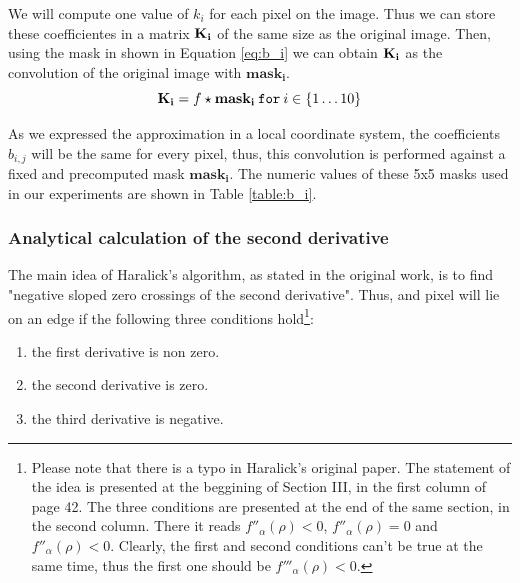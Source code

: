\documentclass{ipol}
\numberwithin{equation}{section}
\numberwithin{table}{section}
\begin{document}
{\vspace{1ex}
\myn{\label{second_derivative:haralick:mask_computation}} We will compute one value of $k_i$ for each pixel on the image. Thus we can store these coefficientes in a matrix $\bf{K_i}$ of the same size as the original image. Then, using the mask in shown in Equation \ref{eq:b_i} we can obtain $\bf{K_i}$ as the convolution of the original image with $\mathbf{mask_i}$. \\
\begin{equation}
	\label{eq:convolution_b}
	\mathbf{K_i} = f \star \mathbf{mask_i} \: \mathtt{for} \: i \in \{1 \ldots 10\}\\
\end{equation}

As we expressed the approximation in a local coordinate system, the coefficients $b_{i,j}$ will be the same for every pixel, thus, this convolution is performed against a fixed and precomputed mask $\mathbf{mask_i}$. The numeric values of these 5x5 masks used in our experiments are shown in Table \ref{table:b_i}.




\subsubsection{Analytical calculation of the second derivative}
\label{sec:secderivative}

\myn{\label{second_derivative:haralick:analitical:condition}} The main idea of Haralick's algorithm, as stated in the original work, is to find "negative sloped zero crossings of the second derivative". Thus, and pixel will lie on an edge if the following three conditions hold\footnote{Please note that there is a typo in Haralick's original paper. The statement of the idea is presented at the beggining of Section III, in the first column of page 42. The three conditions are presented at the end of the same section, in the second column. There it reads $f''_{\alpha}(\rho)<0$, $f''_{\alpha}(\rho)=0$ and $f''_{\alpha}(\rho)<0$. Clearly, the first and second conditions can't be true at the same time, thus the first one should be $f'''_{\alpha}(\rho)<0$.}:

\begin{enumerate}
\item the first derivative is non zero.
\item the second derivative is zero.
\item the third derivative is negative.
\end{enumerate}

}
\end{document}
